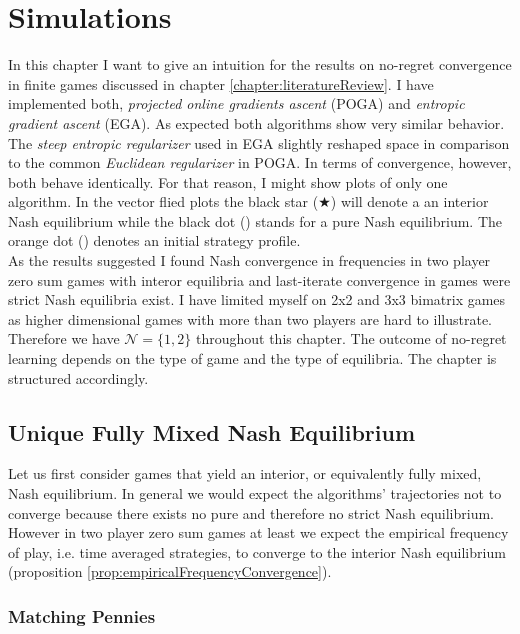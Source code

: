 
\chapter{Simulations}\label{chapter:simulations}

In this chapter I want to give an intuition for the results on no-regret convergence in finite games discussed in chapter \ref{chapter:literatureReview}. I have implemented both, \textit{projected online gradients ascent} (POGA) and \textit{entropic gradient ascent} (EGA). As expected both algorithms show very similar behavior. The \textit{steep entropic regularizer} used in EGA slightly reshaped space in comparison to the common \textit{Euclidean regularizer} in POGA. In terms of convergence, however, both behave identically. For that reason, I might show plots of only one algorithm. In the vector flied plots the black star ($\bigstar$) will denote a an interior Nash equilibrium while the black dot ({\Large\textbullet}) stands for a pure Nash equilibrium. The orange dot ({\color[HTML]{E37222}\Large\textbullet}) denotes an initial strategy profile. \\

As the results suggested I found Nash convergence in frequencies in two player zero sum games with interor equilibria and last-iterate convergence in games were strict Nash equilibria exist. I have limited myself on 2x2 and 3x3 bimatrix games as higher dimensional games with more than two players are hard to illustrate. Therefore we have $\mathcal{N} = \{1,2\}$ throughout this chapter. The outcome of no-regret learning depends on the type of game and the type of equilibria. The chapter is structured accordingly. 

\section{Unique Fully Mixed Nash Equilibrium}\label{section:uniqueMixedNashEquilibrium}

Let us first consider games that yield an interior, or equivalently fully mixed, Nash equilibrium. In general we would expect the algorithms' trajectories not to converge because there exists no pure and therefore no strict Nash equilibrium. However in two player zero sum games at least we expect the empirical frequency of play, i.e. time averaged strategies, to converge to the interior Nash equilibrium (proposition \ref{prop:empiricalFrequencyConvergence}).

\subsection{Matching Pennies}\label{subsection:machtingPennies}

